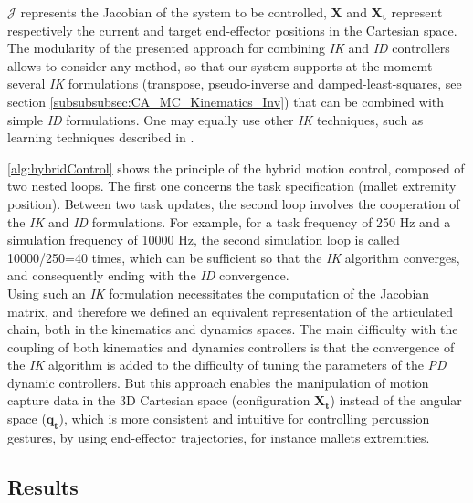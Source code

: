 $\mathcal{J}$ represents the Jacobian of the system to be controlled, $\boldsymbol{X}$ and $\boldsymbol{X_t}$ represent respectively the current and target end-effector positions in the Cartesian space. The modularity of the presented approach for combining \emph{IK} and \emph{ID} controllers allows to consider any method, so that our system supports at the momemt several \emph{IK} formulations (transpose, pseudo-inverse and damped-least-squares, see section \ref{subsubsubsec:CA_MC_Kinematics_Inv}) that can be combined with simple \emph{ID} formulations. One may equally use other \emph{IK} techniques, such as learning techniques described in .

\myalgname \ref{alg:hybridControl} shows the principle of the hybrid motion control, composed of two nested loops. The first one concerns the task specification (mallet extremity position). Between two task updates, the second loop involves the cooperation of the \emph{IK} and \emph{ID} formulations. For example, for a task frequency of 250 Hz and a simulation frequency of 10000 Hz, the second simulation loop is called 10000/250=40 times, which can be sufficient  so that the \emph{IK} algorithm converges, and consequently ending with the \emph{ID} convergence.\\

Using such an \emph{IK} formulation necessitates the computation of the Jacobian matrix, and therefore we defined an equivalent representation of the articulated chain, both in the kinematics and dynamics spaces. The main difficulty with the coupling of both kinematics and dynamics controllers is that the convergence of the \emph{IK} algorithm is added to the difficulty of tuning the parameters of the \emph{PD} dynamic controllers. But this approach enables the manipulation of motion capture data in the 3D Cartesian space (configuration $\boldsymbol{X_t}$) instead of the angular space ($\boldsymbol{q_t}$), which is more consistent and intuitive for controlling percussion gestures, by using end-effector trajectories, for instance mallets extremities.\\


		\subsection{Results}
		\label{subsec:Synthesis_Physics_Results}


